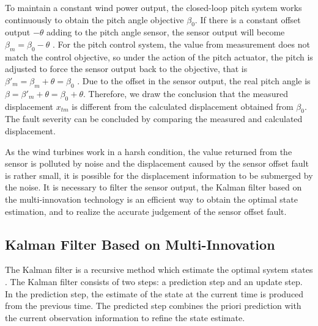 \documentclass{article}
\begin{document}
To maintain a constant wind power output, the closed-loop pitch system works
continuously to obtain the pitch angle objective $\beta_0$. If there
is a constant offset output $-\theta$  adding to the pitch angle sensor,
the sensor output will become $\beta_m = \beta_0 - \theta$ . For the pitch control system,
the value from measurement does not match the control objective, so under
the action of the pitch actuator, the pitch is adjusted  to force the sensor output
back to the objective, that is $\beta'_m=\beta_m + \theta = \beta_0$ . Due to the
offset in the sensor output, the real pitch angle is  $\beta=\beta'_m+\theta=\beta_0+\theta$.
Therefore, we draw the conclusion that the measured displacement $x_{tm}$  is
different from the calculated displacement obtained from $\beta_0$. The fault
severity can be concluded by comparing the measured and calculated displacement.

As the wind turbines work in a harsh condition, the value returned from
the sensor is polluted by noise and the displacement caused by
the sensor offset fault is rather small, it is possible for the displacement
 information to be submerged by the noise. It is necessary to filter the
 sensor output, the Kalman filter based on the multi-innovation technology
 is an efficient way to obtain the optimal state estimation, and to realize
the accurate judgement of the sensor offset fault.



\subsection{Kalman Filter Based on Multi-Innovation}

The Kalman filter is a recursive method which estimate the optimal
system states \cite{ref:16}. The Kalman filter consists of two steps: a prediction
step and an update step. In the prediction step, the estimate of the
state at the current time is produced from the previous time.
The predicted step combines the priori prediction with the current
observation information to refine the state estimate.
\end{document}
